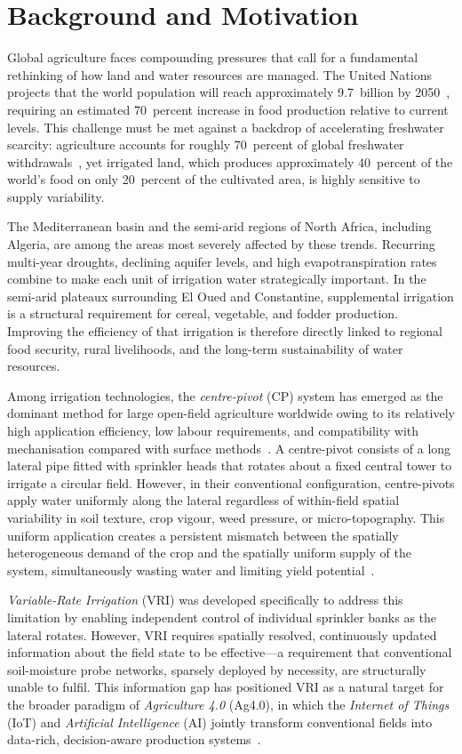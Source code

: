 \documentclass[12pt,a4paper]{report}
\newcommand{\abbr}[2]{\emph{#1} (#2)}
\begin{document}
\section{Background and Motivation}

Global agriculture faces compounding pressures that call for a fundamental rethinking of how land and water resources are managed. The United Nations projects that the world population will reach approximately 9.7~billion by 2050~\cite{FAO2020}, requiring an estimated 70~percent increase in food production relative to current levels. This challenge must be met against a backdrop of accelerating freshwater scarcity: agriculture accounts for roughly 70~percent of global freshwater withdrawals~\cite{FAO2020}, yet irrigated land, which produces approximately 40~percent of the world's food on only 20~percent of the cultivated area, is highly sensitive to supply variability.

The Mediterranean basin and the semi-arid regions of North Africa, including Algeria, are among the areas most severely affected by these trends. Recurring multi-year droughts, declining aquifer levels, and high evapotranspiration rates combine to make each unit of irrigation water strategically important. In the semi-arid plateaux surrounding El Oued and Constantine, supplemental irrigation is a structural requirement for cereal, vegetable, and fodder production. Improving the efficiency of that irrigation is therefore directly linked to regional food security, rural livelihoods, and the long-term sustainability of water resources.

Among irrigation technologies, the \abbr{centre-pivot}{CP} system has emerged as the dominant method for large open-field agriculture worldwide owing to its relatively high application efficiency, low labour requirements, and compatibility with mechanisation compared with surface methods~\cite{Evans2012}. A centre-pivot consists of a long lateral pipe fitted with sprinkler heads that rotates about a fixed central tower to irrigate a circular field. However, in their conventional configuration, centre-pivots apply water uniformly along the lateral regardless of within-field spatial variability in soil texture, crop vigour, weed pressure, or micro-topography. This uniform application creates a persistent mismatch between the spatially heterogeneous demand of the crop and the spatially uniform supply of the system, simultaneously wasting water and limiting yield potential~\cite{Pierce1999}.

\abbr{Variable-Rate Irrigation}{VRI} was developed specifically to address this limitation by enabling independent control of individual sprinkler banks as the lateral rotates. However, VRI requires spatially resolved, continuously updated information about the field state to be effective---a requirement that conventional soil-moisture probe networks, sparsely deployed by necessity, are structurally unable to fulfil. This information gap has positioned VRI as a natural target for the broader paradigm of \abbr{Agriculture 4.0}{Ag4.0}, in which the \abbr{Internet of Things}{IoT} and \abbr{Artificial Intelligence}{AI} jointly transform conventional fields into data-rich, decision-aware production systems~\cite{Liu2020}.
\end{document}
